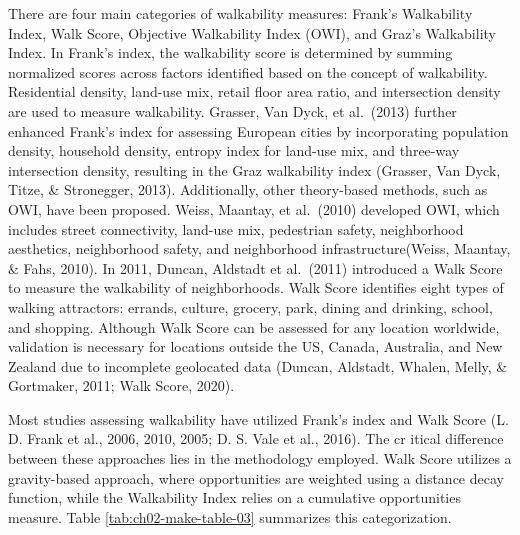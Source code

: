 \documentclass[
11pt, %
oneside, %
english, %
singlespacing, %
]{macthesis} %
\begin{document}
There are four main categories of walkability measures: Frank's Walkability Index, Walk Score, Objective Walkability Index (OWI), and Graz's Walkability Index. In Frank's index, the walkability score is determined by summing normalized scores across factors identified based on the concept of walkability. Residential density, land-use mix, retail floor area ratio, and intersection density are used to measure walkability. Grasser, Van Dyck, et al.~(2013) further enhanced Frank's index for assessing European cities by incorporating population density, household density, entropy index for land-use mix, and three-way intersection density, resulting in the Graz walkability index (Grasser, Van Dyck, Titze, \& Stronegger, 2013). Additionally, other theory-based methods, such as OWI, have been proposed. Weiss, Maantay, et al.~(2010) developed OWI, which includes street connectivity, land-use mix, pedestrian safety, neighborhood aesthetics, neighborhood safety, and neighborhood infrastructure(Weiss, Maantay, \& Fahs, 2010). In 2011, Duncan, Aldstadt et al.~(2011) introduced a Walk Score to measure the walkability of neighborhoods. Walk Score identifies eight types of walking attractors: errands, culture, grocery, park, dining and drinking, school, and shopping. Although Walk Score can be assessed for any location worldwide, validation is necessary for locations outside the US, Canada, Australia, and New Zealand due to incomplete geolocated data (Duncan, Aldstadt, Whalen, Melly, \& Gortmaker, 2011; Walk Score, 2020).

Most studies assessing walkability have utilized Frank's index and Walk Score (L. D. Frank et al., 2006, 2010, 2005; D. S. Vale et al., 2016). The cr
itical difference between these approaches lies in the methodology employed. Walk Score utilizes a gravity-based approach, where opportunities are weighted using a distance decay function, while the Walkability Index relies on a cumulative opportunities measure. Table \ref{tab:ch02-make-table-03} summarizes this categorization.
\end{document}
